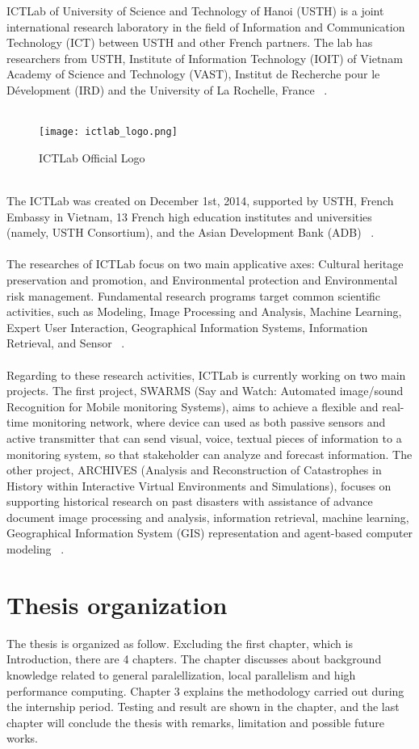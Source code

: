 ICTLab of University of Science and Technology of Hanoi (USTH) is a joint international research laboratory in the field of Information and Communication Technology (ICT) between USTH and other French partners. The lab has researchers from USTH, Institute of Information Technology (IOIT) of Vietnam Academy of Science and Technology (VAST), Institut de Recherche pour le Dévelopment (IRD) and the University of La Rochelle, France ~\cite{ictlab}. \\
~\\
\begin{figure}[h]
\texttt{[image: ictlab\_logo.png]}
\centering
\caption{ICTLab Official Logo}
\end{figure}
~\\
The ICTLab was created on December 1st, 2014, supported by USTH, French Embassy in Vietnam, 13 French high education institutes and universities (namely, USTH Consortium), and the Asian Development Bank (ADB) ~\cite{ictlab}. \\
~\\
The researches of ICTLab focus on two main applicative axes: Cultural heritage preservation and promotion, and Environmental protection and Environmental risk management. Fundamental research programs target common scientific activities, such as Modeling, Image Processing and Analysis, Machine Learning, Expert User Interaction, Geographical Information Systems, Information Retrieval, and Sensor ~\cite{ictlab}. \\
~\\
Regarding to these research activities, ICTLab is currently working on two main projects. The first project, SWARMS (Say and Watch: Automated image/sound Recognition for Mobile monitoring Systems), aims to achieve a flexible and real-time monitoring network, where device can used as both passive sensors and active transmitter that can send visual, voice, textual pieces of information to a monitoring system, so that stakeholder can analyze and forecast information. The other project, ARCHIVES (Analysis and Reconstruction of Catastrophes in History within Interactive Virtual Environments and Simulations), focuses on supporting historical research on past disasters with assistance of advance document image processing and analysis, information retrieval, machine learning, Geographical Information System (GIS) representation and agent-based computer modeling ~\cite{ictlab}. \\

\section{Thesis organization}

The thesis is organized as follow. Excluding the first chapter, which is Introduction, there are 4 chapters. The  chapter discusses about background knowledge related to general paralellization, local parallelism and high performance computing. Chapter 3 explains the methodology carried out during the internship period. Testing and result are shown in the  chapter, and the last chapter will conclude the thesis with remarks, limitation and possible future works. 
